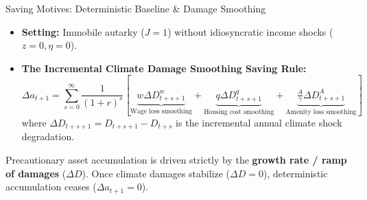 \documentclass[aspectratio=169, 10pt]{beamer}
\begin{document}
\begin{frame}{Saving Motives: Deterministic Baseline \& Damage Smoothing \hfill \hyperlink{backup:shift_share_algo}{\scriptsize{}}}\label{main:saving_det}
    \begin{itemize}\small\setlength{\itemsep}{4pt}
        \item \textbf{Setting:} Immobile autarky ($J = 1$) without idiosyncratic income shocks ($z = 0, \eta = 0$).
        \item \textbf{The Incremental Climate Damage Smoothing Saving Rule:}
        \begin{equation}
        \Delta a_{t+1} = \sum_{s=0}^{\infty} \frac{1}{(1+r)^s} \left[ \underbrace{w \Delta D^w_{t+s+1}}_{\text{Wage loss smoothing}} + \underbrace{q \Delta D^q_{t+s+1}}_{\text{Housing cost smoothing}} + \underbrace{\tfrac{A}{\gamma} \Delta D^A_{t+s+1}}_{\text{Amenity loss smoothing}} \right]
        \label{eq:saving_smooth}
        \end{equation}
        where $\Delta D_{t+s+1} = D_{t+s+1} - D_{t+s}$ is the incremental annual climate shock degradation.
    \end{itemize}
    \vspace{0.15cm}
    \begin{tcolorbox}[takeawaybox, title=Economic Takeaway]
        \small Precautionary asset accumulation is driven strictly by the \textbf{growth rate / ramp of damages} ($\Delta D$). Once climate damages stabilize ($\Delta D = 0$), deterministic accumulation ceases ($\Delta a_{t+1} = 0$).
    \end{tcolorbox}
\end{frame}
\end{document}
